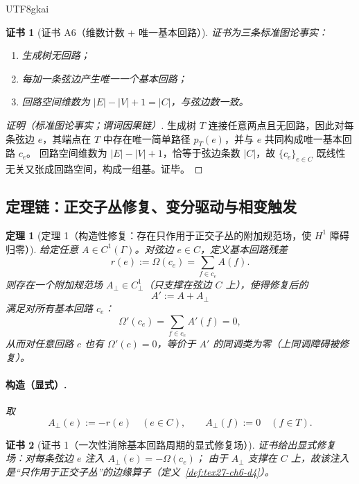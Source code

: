 \documentclass[12pt]{article}
\newtheorem{theorem}{定理}[section]
\newtheorem{Certificate}{证书}[section]
\begin{document}
\begin{CJK*}{UTF8}{gkai}
\begin{Certificate}[证书 A6（维数计数 + 唯一基本回路）]
\label{cert:tex27-ch6-a6}
证书为三条标准图论事实：
\begin{enumerate}
  \item 生成树无回路；
  \item 每加一条弦边产生唯一一个基本回路；
  \item 回路空间维数为 $|E|-|V|+1=|C|$，与弦边数一致。
\end{enumerate}
\end{Certificate}

\begin{proof}[证明（标准图论事实；谓词因果链）]
生成树 $T$ 连接任意两点且无回路，因此对每条弦边 $e$，其端点在 $T$ 中存在唯一简单路径 $p_T(e)$，并与 $e$ 共同构成唯一基本回路 $c_e$。
回路空间维数为 $|E|-|V|+1$，恰等于弦边条数 $|C|$，故 $\{c_e\}_{e\in C}$ 既线性无关又张成回路空间，构成一组基。证毕。
\end{proof}

\subsection{定理链：正交子丛修复、变分驱动与相变触发}
\label{subsec:tex27-ch6-theorems}

\begin{theorem}[定理 1（构造性修复：存在只作用于正交子丛的附加规范场，使 $H^1$ 障碍归零）]
\label{thm:tex27-ch6-thm1}
给定任意 $A\in C^1(\Gamma)$。对弦边 $e\in C$，定义基本回路残差
\[
  r(e):=\Omega(c_e)=\sum_{f\in c_e}A(f).
\]
则存在一个附加规范场 $A_{\perp}\in C^1_{\perp}$（只支撑在弦边 $C$ 上），使得修复后的
\[
  A':=A + A_{\perp}
\]
满足对所有基本回路 $c_e$：
\[
  \Omega'(c_e)=\sum_{f\in c_e}A'(f)=0,
\]
从而对任意回路 $c$ 也有 $\Omega'(c)=0$，等价于 $A'$ 的同调类为零（上同调障碍被修复）。

\paragraph{构造（显式）.}
取
\[
  A_{\perp}(e):=-r(e)\quad (e\in C),\qquad A_{\perp}(f):=0\quad (f\in T).
\]
\end{theorem}

\begin{Certificate}[证书 1（一次性消除基本回路周期的显式修复场）]
\label{cert:tex27-ch6-thm1}
证书给出显式修复场：对每条弦边 $e$ 注入 $A_{\perp}(e)=-\Omega(c_e)$；
由于 $A_{\perp}$ 支撑在 $C$ 上，故该注入是“只作用于正交子丛”的边缘算子（定义~\ref{def:tex27-ch6-d4}）。
\end{Certificate}


\end{CJK*}
\end{document}
